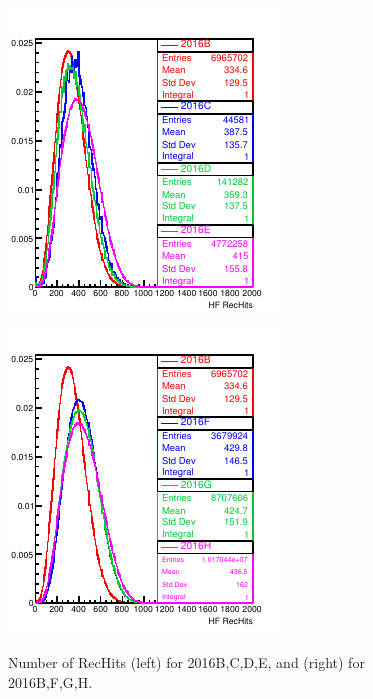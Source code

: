 \begin{figure}[!h] %
\centering
\includegraphics[width=0.45\linewidth]{../Figures/Chap2/ImageFiles_HF/BasicPics/Comp2016/nRecHits2016BtoE.pdf}
\includegraphics[width=0.45\linewidth]{../Figures/Chap2/ImageFiles_HF/BasicPics/Comp2016/nRecHits2016BFGH.pdf}
\caption[No. of rechits for 2016 run eras]{Number of RecHits (left) for 2016B,C,D,E, and (right) for 2016B,F,G,H.}
\label{nRecHits2016BtoH}
\end{figure}


